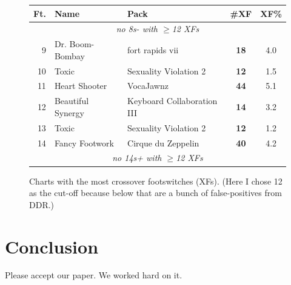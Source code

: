 \documentclass[10pt]{sigplanconf}
\begin{document}
\begin{figure}[t]
	\begin{center}
		\small
	\begin{tabular}{r|l|l|c|c}
		\bf Ft. & \bf Name & \bf Pack & \bf \#XF & \bf XF\% \\
		\hline
		\multicolumn{5}{c}{\em no 8s- with $\ge$12 XFs} \\
		 9 & Dr. Boom-Bombay   & fort rapids vii            & \bf 18 & 4.0 \\
		10 & Toxic             & Sexuality Violation 2      & \bf 12 & 1.5 \\
		11 & Heart Shooter     & VocaJawnz                  & \bf 44 & 5.1 \\
		12 & Beautiful Synergy & Keyboard Collaboration III & \bf 14 & 3.2 \\
		13 & Toxic             & Sexuality Violation 2      & \bf 12 & 1.2 \\
		14 & Fancy Footwork    & Cirque du Zeppelin         & \bf 40 & 4.2 \\
		\multicolumn{5}{c}{\em no 14s+ with $\ge$12 XFs} \\
	\end{tabular}
	\end{center}
	\caption{Charts with the most crossover footswitches (XFs). (Here I chose 12 as the cut-off because below that are a bunch of false-positives from DDR.)}
\end{figure}

\section{Conclusion}

Please accept our paper.
We worked hard on it.




\end{document}
